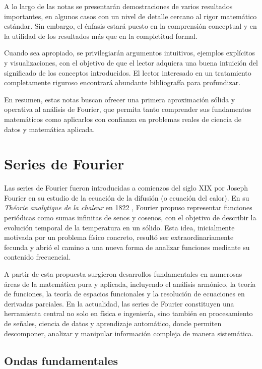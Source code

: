 \documentclass[12pt, a4paper]{amsbook}
\theoremstyle{remark}
\theoremstyle{definition}
\numberwithin{section}{chapter}
\numberwithin{subsection}{section}
\numberwithin{equation}{section}
\numberwithin{figure}{chapter}
\begin{document}
A lo largo de las notas se presentarán demostraciones de varios resultados importantes, en algunos casos con un nivel de detalle cercano al rigor matemático estándar. Sin embargo, el énfasis estará puesto en la comprensión conceptual y en la utilidad de los resultados más que en la completitud formal.

Cuando sea apropiado, se privilegiarán argumentos intuitivos, ejemplos explícitos y visualizaciones, con el objetivo de que el lector adquiera una buena intuición del significado de los conceptos introducidos. El lector interesado en un tratamiento completamente riguroso encontrará abundante bibliografía para profundizar.

En resumen, estas notas buscan ofrecer una primera aproximación sólida y operativa al análisis de Fourier, que permita tanto comprender sus fundamentos matemáticos como aplicarlos con confianza en problemas reales de ciencia de datos y matemática aplicada.


\chapter{Series de Fourier}\label{chap:series}

Las series de Fourier fueron introducidas a comienzos del siglo XIX por Joseph Fourier en su estudio de la ecuación de la difusión (o ecuación del calor). En su {\em Théorie analytique de la chaleur} en 1822 \cite{Fourier}, Fourier propuso representar funciones periódicas como sumas infinitas de senos y cosenos, con el objetivo de describir la evolución temporal de la temperatura en un sólido. Esta idea, inicialmente motivada por un problema físico concreto, resultó ser extraordinariamente fecunda y abrió el camino a una nueva forma de analizar funciones mediante su contenido frecuencial.

A partir de esta propuesta surgieron desarrollos fundamentales en numerosas áreas de la matemática pura y aplicada, incluyendo el análisis armónico, la teoría de funciones, la teoría de espacios funcionales y la resolución de ecuaciones en derivadas parciales. En la actualidad, las series de Fourier constituyen una herramienta central no solo en física e ingeniería, sino también en procesamiento de señales, ciencia de datos y aprendizaje automático, donde permiten descomponer, analizar y manipular información compleja de manera sistemática.

\section{Ondas fundamentales}\label{sec:ondas-fundamentales}
\end{document}
